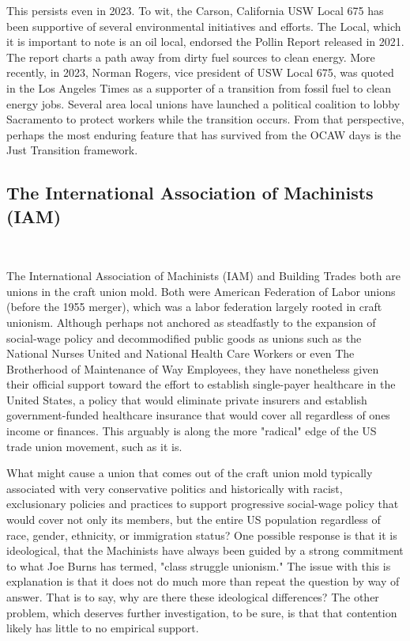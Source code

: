 This persists even in 2023. To wit, the Carson, California USW Local 675 has been supportive of several environmental initiatives and efforts. The Local, which it is important to note is an oil local, endorsed the Pollin Report released in 2021. The report charts a path away from dirty fuel sources to clean energy. More recently, in 2023, Norman Rogers, vice president of USW Local 675, was quoted in the Los Angeles Times as a supporter of a transition from fossil fuel to clean energy jobs. Several area local unions have launched a political coalition to lobby Sacramento to protect workers while the transition occurs. From that perspective, perhaps the most enduring feature that has survived from the OCAW days is the Just Transition framework.



\subsection{The International Association of Machinists (IAM)} \

The International Association of Machinists (IAM) and Building Trades both are unions in the craft union mold. Both were American Federation of Labor unions (before the 1955 merger), which was a labor federation largely rooted in craft unionism. Although perhaps not anchored as steadfastly to the expansion of social-wage policy and decommodified public goods as unions such as the National Nurses United and National Health Care Workers or even The Brotherhood of Maintenance of Way Employees, they have nonetheless given their official support toward the effort to establish single-payer healthcare in the United States, a policy that would eliminate private insurers and establish government-funded healthcare insurance that would cover all regardless of ones income or finances. This arguably is along the more "radical" edge of the US trade union movement, such as it is.

What might cause a union that comes out of the craft union mold typically associated with very conservative politics and historically with racist, exclusionary policies and practices to support progressive social-wage policy that would cover not only its members, but the entire US population regardless of race, gender, ethnicity, or immigration status? One possible response is that it is ideological, that the Machinists have always been guided by a strong commitment to what Joe Burns has termed, "class struggle unionism." The issue with this is explanation is that it does not do much more than repeat the question by way of answer. That is to say, why are there these ideological differences? The other problem, which deserves further investigation, to be sure, is that that contention likely has little to no empirical support.


